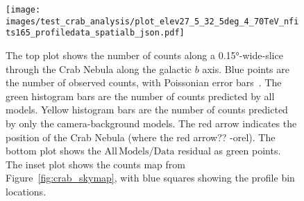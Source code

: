   \begin{figure}[p]
    \centering
    \texttt{[image: images/test\_crab\_analysis/plot\_elev27\_5\_32\_5deg\_4\_70TeV\_nfits165\_profiledata\_spatialb\_json.pdf]}
    \caption[Crab Nebula Profile along Galactic $b$]
    {
      The top plot shows the number of counts along a \ang{0.15}-wide-slice through the Crab Nebula along the galactic $b$ axis.
      Blue points are the number of observed counts, with Poissonian error bars~\cite{poissonfrequentistinterval}.
      The green histogram bars are the number of counts predicted by all models.
      Yellow histogram bars are the number of counts predicted by only the camera-background models.
      The red arrow indicates the position of the Crab Nebula {\color{red}(where the red arrow?? -orel)}.
      The bottom plot shows the $\mathrm{All\,Models}/\mathrm{Data}$ residual as green points.
      The inset plot shows the counts map from Figure~\ref{fig:crab_skymap}, with blue squares showing the profile bin locations.
    }
    \label{fig:crab_profile_b}
  \end{figure}
    

